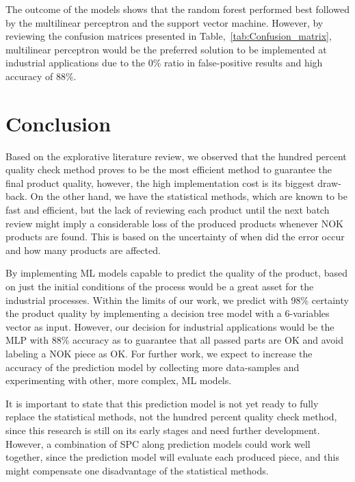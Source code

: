 \documentclass[5p,times,procedia]{elsarticle}
\begin{document}
The outcome of the models shows that the random forest performed best followed by the multilinear perceptron and the support vector machine. However, by reviewing the confusion matrices presented in Table,~\ref{tab:Confusion_matrix}, multilinear perceptron would be the preferred solution to be implemented at industrial applications due to the 0\% ratio in false-positive results and high accuracy of 88\%.

\section{Conclusion} \label{sec:conclusion}


Based on the explorative literature review, we observed that the hundred percent quality check method proves to be the most efficient method to guarantee the final product quality, however, the high implementation cost is its biggest draw-back. On the other hand, we have the statistical methods, which are known to be fast and efficient, but the lack of reviewing each product until the next batch review might imply a considerable loss of the produced products whenever NOK products are found. This is based on the uncertainty of when did the error occur and how many products are affected.

By implementing ML models capable to predict the quality of the product, based on just the initial conditions of the process would be a great asset for the industrial processes. Within the limits of our work, we predict with 98\% certainty the product quality by implementing a decision tree model with a 6-variables vector as input. 
However, our decision for industrial applications would be the MLP with 88\% accuracy as to guarantee that all passed parts are OK and avoid labeling a NOK piece as OK. For further work, we expect to increase the accuracy of the prediction model by collecting more data-samples and experimenting with other, more complex, ML models.

It is important to state that this prediction model is not yet ready to fully replace the statistical methods, not the hundred percent quality check method, since this research is still on its early stages and need further development. However, a combination of SPC along prediction models could work well together, since the prediction model will evaluate each produced piece, and this might compensate one disadvantage of the statistical methods.
\end{document}
